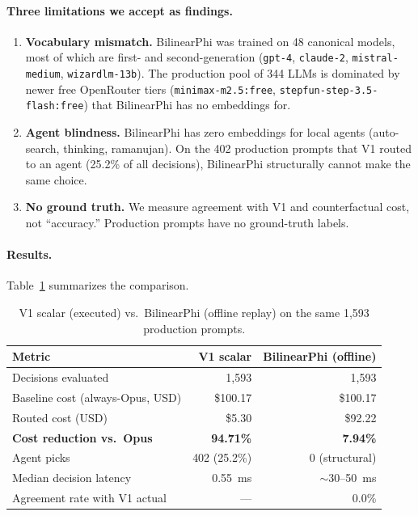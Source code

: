 \paragraph{Three limitations we accept as findings.}
\begin{enumerate}
    \item \textbf{Vocabulary mismatch.} BilinearPhi was trained on 48 canonical models, most of which are first- and second-generation (\texttt{gpt-4}, \texttt{claude-2}, \texttt{mistral-medium}, \texttt{wizardlm-13b}). The production pool of 344 LLMs is dominated by newer free OpenRouter tiers (\texttt{minimax-m2.5:free}, \texttt{stepfun-step-3.5-flash:free}) that BilinearPhi has no embeddings for.
    \item \textbf{Agent blindness.} BilinearPhi has zero embeddings for local agents (auto-search, thinking, ramanujan). On the 402 production prompts that V1 routed to an agent (25.2\% of all decisions), BilinearPhi structurally cannot make the same choice.
    \item \textbf{No ground truth.} We measure agreement with V1 and counterfactual cost, not ``accuracy.'' Production prompts have no ground-truth labels.
\end{enumerate}

\paragraph{Results.} Table~\ref{tab:three_views} summarizes the comparison.

\begin{table}[h]
\centering
\caption{V1 scalar (executed) vs.\ BilinearPhi (offline replay) on the same 1{,}593 production prompts.}
\label{tab:three_views}
\small
\begin{tabular}{lrr}
\toprule
\textbf{Metric} & \textbf{V1 scalar} & \textbf{BilinearPhi (offline)} \\
\midrule
Decisions evaluated & 1{,}593 & 1{,}593 \\
Baseline cost (always-Opus, USD) & \$100.17 & \$100.17 \\
Routed cost (USD) & \$5.30 & \$92.22 \\
\textbf{Cost reduction vs.\ Opus} & \textbf{94.71\%} & \textbf{7.94\%} \\
Agent picks & 402 (25.2\%) & 0 (structural) \\
Median decision latency & 0.55~ms & $\sim$30--50~ms \\
Agreement rate with V1 actual & --- & 0.0\% \\
\bottomrule
\end{tabular}
\end{table}

